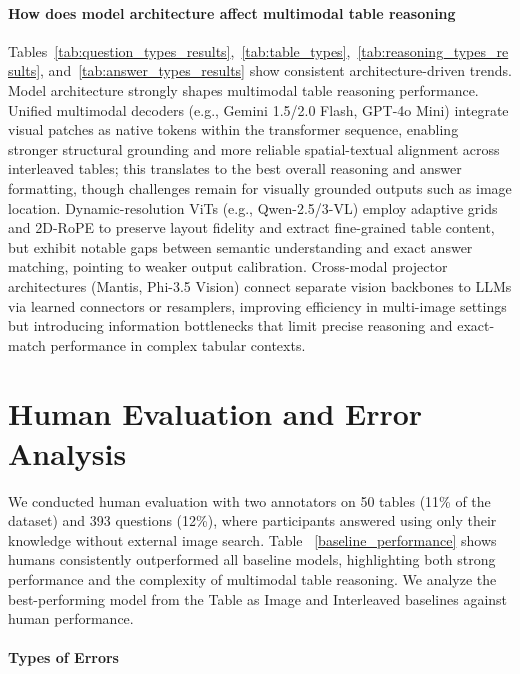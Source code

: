 \documentclass[11pt]{article}
\begin{document}
\vspace{-0.5em}

\paragraph{How does model architecture affect multimodal table reasoning}
Tables~\ref{tab:question_types_results},~\ref{tab:table_types},~\ref{tab:reasoning_types_results}, and~\ref{tab:answer_types_results} show consistent architecture-driven trends. Model architecture strongly shapes multimodal table reasoning performance. Unified multimodal decoders (e.g., Gemini 1.5/2.0 Flash, GPT-4o Mini) integrate visual patches as native tokens within the transformer sequence, enabling stronger structural grounding and more reliable spatial-textual alignment across interleaved tables; this translates to the best overall reasoning and answer formatting, though challenges remain for visually grounded outputs such as image location. Dynamic-resolution ViTs (e.g., Qwen-2.5/3-VL) employ adaptive grids and 2D-RoPE \cite{heo2024rotary} to preserve layout fidelity and extract fine-grained table content, but exhibit notable gaps between semantic understanding and exact answer matching, pointing to weaker output calibration. Cross-modal projector architectures (Mantis, Phi-3.5 Vision) connect separate vision backbones to LLMs via learned connectors or resamplers, improving efficiency in multi-image settings but introducing information bottlenecks that limit precise reasoning and exact-match performance in complex tabular contexts.


\section{Human Evaluation and Error Analysis}\label{sec:HEEA_main}

We conducted human evaluation with two annotators on 50 tables (11\% of the dataset) and 393 questions (12\%), where participants answered using only their knowledge without external image search. Table ~\ref{baseline_performance} shows humans consistently outperformed all baseline models, highlighting both strong performance and the complexity of multimodal table reasoning. We analyze the best-performing model from the Table as Image and Interleaved baselines against human performance.





\paragraph{Types of Errors}
\end{document}
